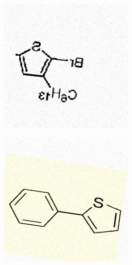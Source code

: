 \begin{figure}[H]
\centering
    \begin{subfigure}{.35\textwidth}
        \centering
        \includegraphics[width=1\linewidth]{imagenes/aug2/169.jpg}
    \end{subfigure}%
    \begin{subfigure}{.35\textwidth}
        \centering
        \includegraphics[width=1\linewidth]{imagenes/aug2/188.jpg}
    \end{subfigure}%


\end{figure}
